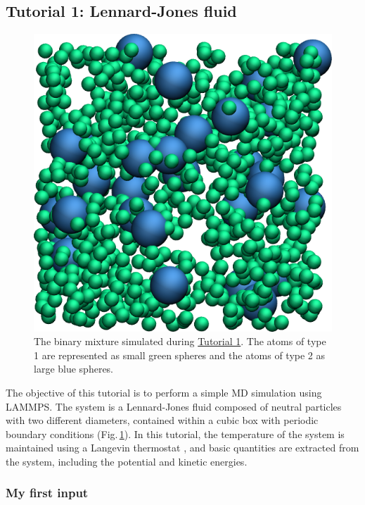 \documentclass[9pt,tutorial]{livecoms}
\begin{document}
\subsection{Tutorial 1: Lennard-Jones fluid}
\label{lennard-jones-label}

\begin{figure}
\centering
\includegraphics[width=0.55\linewidth]{LJ}
\caption{The binary mixture simulated during \hyperref[lennard-jones-label]{Tutorial 1}. The atoms of type 1 are represented as small green spheres and the atoms of type 2 as large blue spheres.}
\label{fig:LJ}
\end{figure}

\noindent The objective of this tutorial is to perform a simple MD simulation using LAMMPS. The system is a Lennard-Jones fluid composed of neutral particles with two different diameters, contained within a cubic box with periodic boundary conditions (Fig.\,\ref{fig:LJ}). In this tutorial, the temperature of the system is maintained using a Langevin thermostat \cite{schneider1978molecular}, and basic quantities are extracted from the system, including the potential and kinetic energies.

\subsubsection{My first input}
\end{document}
